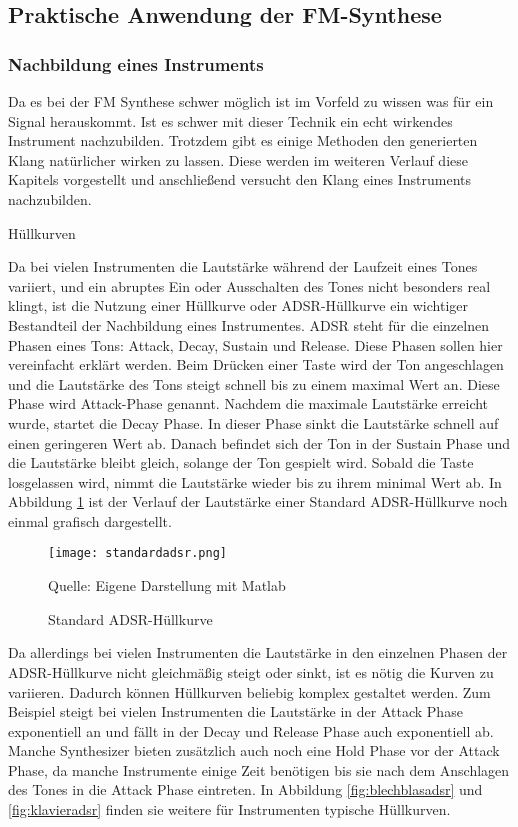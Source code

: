 \subsection{Praktische Anwendung der FM-Synthese}
\FloatBarrier
\subsubsection{Nachbildung eines Instruments}
Da es bei der FM Synthese schwer möglich ist im Vorfeld zu wissen was für ein Signal herauskommt. Ist es schwer mit dieser Technik ein echt wirkendes Instrument nachzubilden.
Trotzdem gibt es einige Methoden den generierten Klang natürlicher wirken zu lassen. Diese werden im weiteren Verlauf diese Kapitels vorgestellt und anschließend versucht den Klang eines Instruments nachzubilden.

Hüllkurven

Da bei vielen Instrumenten die Lautstärke während der Laufzeit eines Tones variiert, und ein abruptes Ein oder Ausschalten des Tones nicht besonders real klingt, ist die Nutzung einer Hüllkurve oder ADSR-Hüllkurve ein wichtiger Bestandteil der Nachbildung eines Instrumentes. ADSR steht für die einzelnen Phasen eines Tons: Attack, Decay, Sustain und Release. Diese Phasen sollen hier vereinfacht erklärt werden. Beim Drücken einer Taste wird der Ton angeschlagen und die Lautstärke des Tons steigt schnell bis zu einem maximal Wert an. Diese Phase wird Attack-Phase genannt. Nachdem die maximale Lautstärke erreicht wurde, startet die Decay Phase. In dieser Phase sinkt die Lautstärke schnell auf einen geringeren Wert ab. Danach befindet sich der Ton in der Sustain Phase und die Lautstärke bleibt gleich, solange der Ton gespielt wird. Sobald die Taste losgelassen wird, nimmt die Lautstärke wieder bis zu ihrem minimal Wert ab. In Abbildung \ref{fig:defaultADSR} ist der Verlauf der Lautstärke einer Standard ADSR-Hüllkurve noch einmal grafisch dargestellt.

\begin{figure} [ht]
\centering
  \texttt{[image: standardadsr.png]}
\caption{Standard ADSR-Hüllkurve}
\label{fig:defaultADSR}
Quelle: Eigene Darstellung mit Matlab
\end{figure}

Da allerdings bei vielen Instrumenten die Lautstärke in den einzelnen Phasen der ADSR-Hüllkurve nicht gleichmäßig steigt oder sinkt, ist es nötig die Kurven zu variieren. Dadurch können Hüllkurven beliebig komplex gestaltet werden. Zum Beispiel steigt bei vielen Instrumenten die Lautstärke in der Attack Phase exponentiell an und fällt in der Decay und Release Phase auch exponentiell ab. Manche Synthesizer bieten zusätzlich auch noch eine Hold Phase vor der Attack Phase, da manche Instrumente einige Zeit benötigen bis sie nach dem Anschlagen des Tones in die Attack Phase eintreten. In Abbildung \ref{fig:blechblasadsr} und \ref{fig:klavieradsr} finden sie weitere für Instrumenten typische Hüllkurven.

